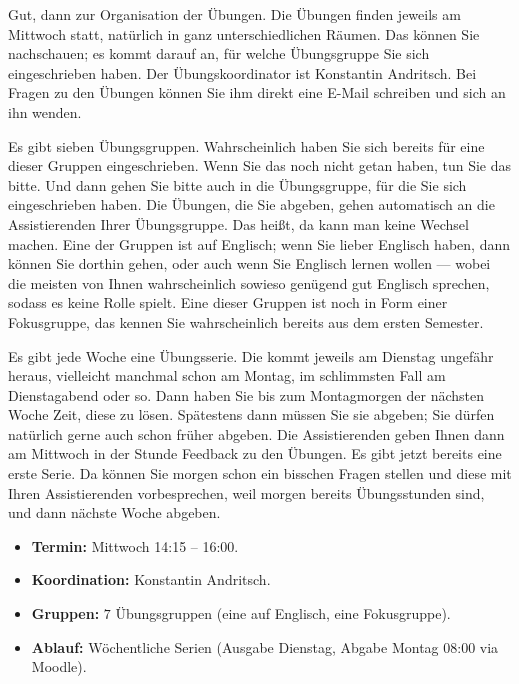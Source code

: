 \begin{spoken-clean}[00:07:30 - 00:09:50]
Gut, dann zur Organisation der Übungen. Die Übungen finden jeweils am Mittwoch statt, natürlich in ganz unterschiedlichen Räumen. Das können Sie nachschauen; es kommt darauf an, für welche Übungsgruppe Sie sich eingeschrieben haben. Der Übungskoordinator ist Konstantin Andritsch. Bei Fragen zu den Übungen können Sie ihm direkt eine E-Mail schreiben und sich an ihn wenden.

Es gibt sieben Übungsgruppen. Wahrscheinlich haben Sie sich bereits für eine dieser Gruppen eingeschrieben. Wenn Sie das noch nicht getan haben, tun Sie das bitte. Und dann gehen Sie bitte auch in die Übungsgruppe, für die Sie sich eingeschrieben haben. Die Übungen, die Sie abgeben, gehen automatisch an die Assistierenden Ihrer Übungsgruppe. Das heißt, da kann man keine Wechsel machen. Eine der Gruppen ist auf Englisch; wenn Sie lieber Englisch haben, dann können Sie dorthin gehen, oder auch wenn Sie Englisch lernen wollen --- wobei die meisten von Ihnen wahrscheinlich sowieso genügend gut Englisch sprechen, sodass es keine Rolle spielt. Eine dieser Gruppen ist noch in Form einer Fokusgruppe, das kennen Sie wahrscheinlich bereits aus dem ersten Semester.

Es gibt jede Woche eine Übungsserie. Die kommt jeweils am Dienstag ungefähr heraus, vielleicht manchmal schon am Montag, im schlimmsten Fall am Dienstagabend oder so. Dann haben Sie bis zum Montagmorgen der nächsten Woche Zeit, diese zu lösen. Spätestens dann müssen Sie sie abgeben; Sie dürfen natürlich gerne auch schon früher abgeben. Die Assistierenden geben Ihnen dann am Mittwoch in der Stunde Feedback zu den Übungen. Es gibt jetzt bereits eine erste Serie. Da können Sie morgen schon ein bisschen Fragen stellen und diese mit Ihren Assistierenden vorbesprechen, weil morgen bereits Übungsstunden sind, und dann nächste Woche abgeben.
\end{spoken-clean}

\begin{math-stroke}
\begin{itemize}
    \item \textbf{Termin:} Mittwoch 14:15 -- 16:00.
    \item \textbf{Koordination:} Konstantin Andritsch.
    \item \textbf{Gruppen:} $7$ Übungsgruppen (eine auf Englisch, eine Fokusgruppe).
    \item \textbf{Ablauf:} Wöchentliche Serien (Ausgabe Dienstag, Abgabe Montag 08:00 via Moodle).
\end{itemize}
\end{math-stroke}

